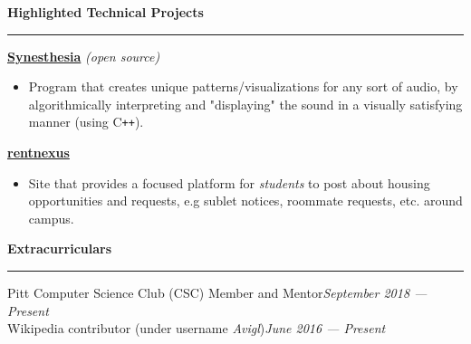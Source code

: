 \documentclass[11pt]{article}
\begin{document}
\begin{flushleft}
		\vspace{1.5mm}
		{\large \raggedright \textbf{Highlighted Technical Projects}}
		\vspace{1.25mm}
	
		\hrule
	
		\vspace{2.25mm}
		\textbf{\href{https://github.com/avigloz/synesthesia}{Synesthesia}} \textit{(open source)}
		\vspace{-2mm}
		\begin{itemize}
			\item Program that creates unique patterns/visualizations for any sort of audio, by algorithmically interpreting and "displaying" the sound in a visually satisfying manner (using C\texttt{++}).
		\end{itemize}
		\vspace{-2mm}
		\textbf{\href{https://rentnexus.net}{rentnexus}}
		\vspace{-2mm}
		\begin{itemize}
			\item Site that provides a focused platform for \textit{students} to post about housing opportunities and requests, e.g sublet notices, roommate requests, etc. around campus.
		\end{itemize}

		\vspace{1.5mm}
		{\large \raggedright \textbf{Extracurriculars}}
		\vspace{1.25mm}
	
		\hrule
	
		\vspace{2.25mm}
		Pitt Computer Science Club (CSC) Member and Mentor\hfill \textit{September 2018 --- Present}\\
		Wikipedia contributor (under username \textit{Avigl})\hfill \textit{June 2016 --- Present}
		
	\end{flushleft}
\end{document}
